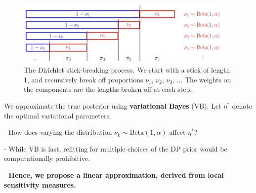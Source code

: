 \documentclass[a0,plainsections,30pt]{sciposter}\usepackage[]{graphicx}\usepackage[]{color}
\newcommand{\etazopt}{\eta_z^{*}}
\newcommand{\etathetaopt}{\eta_\theta^{*}}
\DeclareMathOperator*{\argmin}{arg\,min}
\begin{document}
\begin{minipage}[t]{0.45\textwidth}
\begin{figure}[!h]
\centering
\includegraphics[width = 0.95\textwidth]{./images/DP_stick_breaking.png}
\caption{The Dirichlet stick-breaking process. We start with a stick of
length 1, and recursively break off proportions $\nu_1$, $\nu_2$, $\nu_3$, ...
The weights on the components are the lengths broken off at each step.}
\setlength{\textfloatsep}{-10pt}
\end{figure}

% 
% 

We approximate the true posterior using \textbf{variational Bayes} (VB). Let $\eta^*$ denote the optimal variational parameters.
% 
% 
% 
% 
% 

\begin{mdframed}[style=MyFrame]
- How does varying the distribution $\nu_k \sim \text{Beta}(1, \alpha)$ affect $\eta^*$?

- While VB is fast, refitting for multiple choices of the DP prior would be
computationally prohibitive.

- {\bf Hence, we propose a linear approximation, derived from local sensitivity measures. }
\end{mdframed}



\end{minipage}
\end{document}
